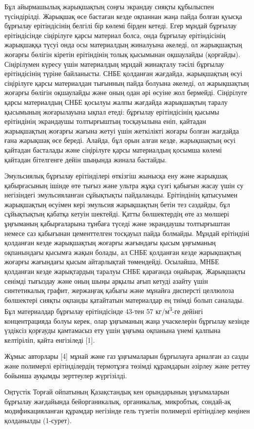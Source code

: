 \begin{multicols}{2}
Бұл айырмашылық жарықшақтың соңғы экрандау сияқты құбылыспен
түсіндірілді. Жарықшақ өсе бастаған кезде оқпаннан жаңа пайда болған
қуысқа бұрғылау ерітіндісінің белгілі бір көлемі бірден кетеді. Егер
мұндай бұрғылау ерітіндісінде сіңірілуге қарсы материал болса, онда
бұрғылау ерітіндісінің жарықшаққа түсуі онда осы материалдың жиналуына
әкеледі, ол жарықшақтың жоғарғы бөлігін кіретін ерітіндінің толық
қысымынан оқшаулайды (қорғайды). Сіңірілумен күресу үшін материалдың
мұндай жинақталу тәсілі бұрғылау ерітіндісінің түріне байланысты. СНБЕ
қолданған жағдайда, жарықшақтың өсуі сіңірілуге қарсы материалдан
тығынның пайда болуына әкеледі, ол жарықшақтың жоғарғы бөлігін
оқшаулайды және оның одан әрі өсуіне жол бермейді. Сіңірілуге қарсы
материалдың СНБЕ қосылуы жалпы жағдайда жарықшақтың таралу қысымының
жоғарылауына ықпал етеді: бұрғылау ерітіндісінің қысымы ерітіндінің
экрандаушы толтырғыштың тосқауылына еніп, қайтадан жарықшақтың жоғарғы
жағына жетуі үшін жеткілікті жоғары болған жағдайда ғана жарықшақ өсе
береді. Алайда, бұл орын алған кезде, жарықшақтың өсуі қайтадан
басталады және сіңірілуге қарсы материалдың қосымша көлемі қайтадан
бітелгенге дейін шыңында жинала бастайды.

Эмульсиялық бұрғылау ерітінділері өткізгіш жынысқа ену және жарықшақ
қабырғасының ішінде өте тығыз және ультра жұқа сүзгі қабығын жасау үшін
су негізіндегі эмульсияланған сұйықтықты пайдаланады. Ерітіндінің
қатысуымен жарықшақтың өсуімен кері эмульсия жарықшақтың бетін тез
саздайды, бұл сұйықтықтың қабатқа кетуін шектейді. Қатты бөлшектердің
өте аз мөлшері ұңғыманың қабырғаларына тұнбаға түседі және экрандаушы
толтырғыштан немесе саз қабығынан цементтелген тосқауыл пайда болмайды.
Мұндай ерітіндіні қолданған кезде жарықшақтың жоғарғы жағындағы қысым
ұңғыманың оқпанындағы қысымға жақын болады, ал СНБЕ қолданған кезде
жарықшақтың жоғарғы жағындағы қысым айтарлықтай төмендейді. Осылайша,
МНБЕ қолданған кезде жарықтардың таралуы СНБЕ қарағанда оңайырақ.
Жарықшақты сенімді тығыздау және оның шыңы арқылы ағып кетуді азайту
үшін синтетикалық графит, жержаңғақ қабығы және мұнайға дисперсті
целлюлоза бөлшектері сияқты оқпанды қатайтатын материалдар ең тиімді
болып саналады. Бұл материалдар бұрғылау ерітіндісінде 43-тен 57
кг/м\textsuperscript{3}-ге дейінгі концентрацияда болуы керек, олар
ұңғыманың жаңа учаскелерін бұрғылау кезінде үздіксіз қорғауды қамтамасыз
ету үшін ұңғыма оқпанына үнемі қалпына келтіріліп, қайта енгізіледі
{[}1{]}.

Жұмыс авторлары {[}4{]} мұнай және газ ұңғымаларын бұрғылауға арналған
аз сазды және полимерлі ерітінділердің термотұзға төзімді құрамдарын
әзірлеу және реттеу бойынша ауқымды зерттеулер жүргізілді.

Оңтүстік Торғай ойпатының Қазақстандық кен орындарының ұңғымаларын
бұрғылау жағдайында бейорганикалық, органикалық, микробтық, сондай-ақ
модификацияланған құрамдар негізінде гель түзетін полимерлі ерітінділер
кеңінен қолданылды (1-сурет).
\end{multicols}


